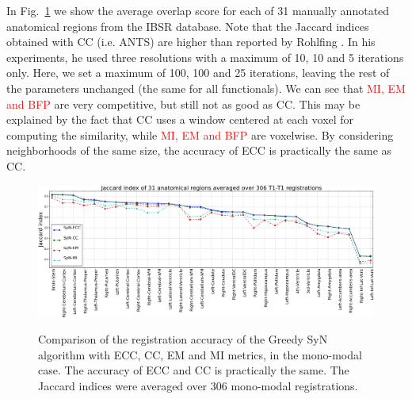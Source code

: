 In \hbox{Fig. \ref{fig:mono_graph_seg}} we show the average overlap score for each of 31 manually annotated anatomical regions from the IBSR database. Note that the Jaccard indices obtained with CC (i.e. ANTS) are higher than reported by Rohlfing \cite{Rohlfing2012}. In his experiments, he used three resolutions with a maximum of 10, 10 and 5 iterations only. Here, we set a maximum of 100, 100 and 25 iterations, leaving the rest of the parameters unchanged (the same for all functionals). We can see that \textcolor{red}{ MI, EM and BFP } are very competitive, but still not as good as CC. This may be explained by the fact that CC uses a window centered at each voxel for computing the similarity, while \textcolor{red}{ MI, EM and BFP } are voxelwise. By considering neighborhoods of the same size, the accuracy of ECC is practically the same as CC.
%
%

\begin{figure}[t!]
\centering
\includegraphics[width=0.95\linewidth]{images/mono_lines_seg.png}\\
\caption{{\small Comparison of the registration accuracy of the Greedy SyN algorithm with ECC, CC, EM and MI metrics, in the mono-modal case. The accuracy of ECC and CC is practically the same. The Jaccard indices were averaged over 306 mono-modal registrations.}}
\label{fig:mono_graph_seg}\figcloser
\end{figure}

